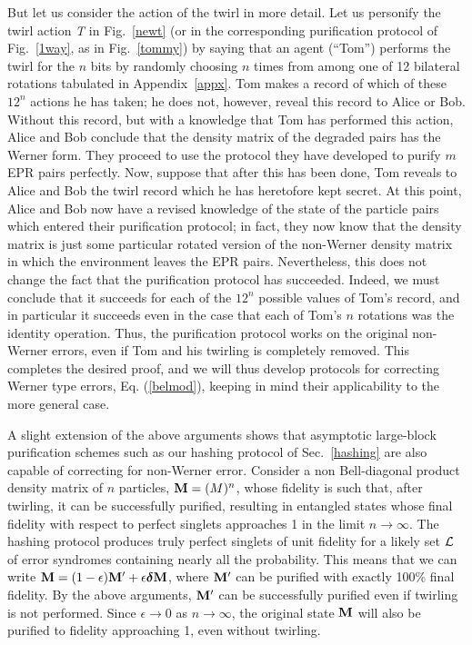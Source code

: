 But let us consider the action of the twirl in more detail.  Let us
personify the twirl action {\it T} in Fig.~\ref{newt} (or in the
corresponding purification protocol of Fig.~\ref{1way}, as in
Fig.~\ref{tommy}) by saying that an agent (``Tom'') performs the twirl
for the $n$ bits by randomly choosing $n$ times from among one of 12
bilateral rotations tabulated in Appendix~\ref{appx}.  Tom makes a record of
which of these $12^n$ actions he has taken; he does not, however,
reveal this record to Alice or Bob.  Without this record, but with a
knowledge that Tom has performed this action, Alice and Bob conclude
that the density matrix of the degraded pairs has the Werner form.
They proceed to use the protocol they have developed to purify $m$ EPR
pairs perfectly.  Now, suppose that after this has been done, Tom
reveals to Alice and Bob the twirl record which he has heretofore kept
secret.  At this point, Alice and Bob now have a revised knowledge of
the state of the particle pairs which entered their purification
protocol; in fact, they now know that the density matrix is just some
particular rotated version of the non-Werner density matrix in which
the environment leaves the EPR pairs.  Nevertheless, this does not
change the fact that the purification protocol has succeeded.  Indeed,
we must conclude that it succeeds for each of the $12^n$ possible
values of Tom's record, and in particular it succeeds even in the case
that each of Tom's $n$ rotations was the identity operation.  Thus,
the purification protocol works on the original non-Werner errors,
even if Tom and his twirling is completely removed.  This completes
the desired proof, and we will thus develop protocols for correcting
Werner type errors, Eq. (\ref{belmod}), keeping in mind their
applicability to the more general case.

A slight extension of the above arguments shows that asymptotic
large-block purification schemes such as our hashing protocol
of Sec.~\ref{hashing} are also
capable of correcting for non-Werner error.  Consider a non
Bell-diagonal product density matrix of $n$ particles, 
${\bf M}=(M)^n$, whose fidelity is such that, after twirling, 
it can be successfully purified, resulting in entangled
states whose final fidelity with respect to perfect singlets
approaches 1 in the limit $n\rightarrow\infty$.  The hashing
protocol produces truly perfect singlets of unit fidelity
for a likely set $\cal L$ of error syndromes containing nearly all
the probability.
This means that we
can write 
${\bf M}=(1-\epsilon) {\bf M'}+\epsilon\mbox{\boldmath{$\delta$}}{\bf M}$, 
where
${\bf M'}$ can be purified with exactly 100\% final fidelity.  By the
above arguments, ${\bf M'}$ can be successfully purified even if
twirling is not performed.  Since $\epsilon\rightarrow 0$ as
$n\rightarrow\infty$, the original state ${\bf M}$ will also be
purified to fidelity approaching 1, even without twirling.

